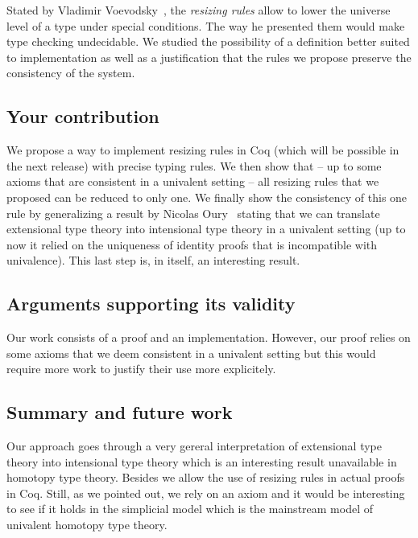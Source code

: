 \documentclass[11pt]{article}
\theoremstyle{plain}
\theoremstyle{remark}
\begin{document}
Stated by Vladimir Voevodsky~\cite{vv:resizing}, the \emph{resizing rules} allow
to lower the universe level of a type under special conditions. The way he
presented them would make type checking undecidable.
We studied the possibility of a definition better suited to implementation
as well as a justification that the rules we propose preserve the consistency
of the system.

\subsection*{Your contribution}

We propose a way to implement resizing rules in Coq (which will be possible in
the next release) with precise typing rules.
We then show that -- up to some axioms that are consistent in a univalent
setting -- all resizing rules that we proposed %
can be reduced to only one.
We finally show the consistency of this one rule by generalizing a result by
Nicolas Oury~\cite{oury2005extensionality} stating that we can translate
extensional type theory into intensional type theory in a univalent setting
(up to now it relied on the uniqueness of identity proofs that is incompatible
with univalence).
This last step is, in itself, an interesting result.

\subsection*{Arguments supporting its validity}

Our work consists of a proof and an implementation.
However, our proof relies on some axioms that we deem consistent in a univalent
setting but this would require more work to justify their use more explicitely.


\subsection*{Summary and future work}

Our approach goes through a very gereral interpretation of extensional type
theory into intensional type theory which is an interesting result unavailable
in homotopy type theory. Besides we allow the use of resizing rules in actual
proofs in Coq.
Still, as we pointed out, we rely on an axiom and it would be interesting to
see if it holds in the simplicial model which is the mainstream model of
univalent homotopy type theory.
\end{document}
